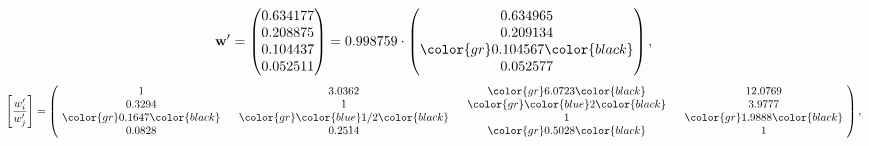 \begin{example}
\begin{equation*}
\mathbf{w}^{\prime} =
\begin{pmatrix}
0.634177\\
0.208875\\
0.104437\\
0.052511
\end{pmatrix} =
0.998759\cdot
\begin{pmatrix}
0.634965\\
0.209134\\
\color{gr} 0.104567\color{black} \\
0.052577
\end{pmatrix},
\end{equation*}
\begin{equation*}
\left[ \frac{{w}^{\prime}_i}{{w}^{\prime}_j} \right] =
\begin{pmatrix}
$\,\,$ 1 $\,\,$ & $\,\,$3.0362$\,\,$ & $\,\,$\color{gr} 6.0723\color{black} $\,\,$ & $\,\,$12.0769$\,\,$ \\
$\,\,$0.3294$\,\,$ & $\,\,$ 1 $\,\,$ & $\,\,$\color{gr} \color{blue} 2\color{black} $\,\,$ & $\,\,$3.9777  $\,\,$ \\
$\,\,$\color{gr} 0.1647\color{black} $\,\,$ & $\,\,$\color{gr} \color{blue}  1/2\color{black} $\,\,$ & $\,\,$ 1 $\,\,$ & $\,\,$\color{gr} 1.9888\color{black}  $\,\,$ \\
$\,\,$0.0828$\,\,$ & $\,\,$0.2514$\,\,$ & $\,\,$\color{gr} 0.5028\color{black} $\,\,$ & $\,\,$ 1  $\,\,$ \\
\end{pmatrix},
\end{equation*}
\end{example}
\newpage
